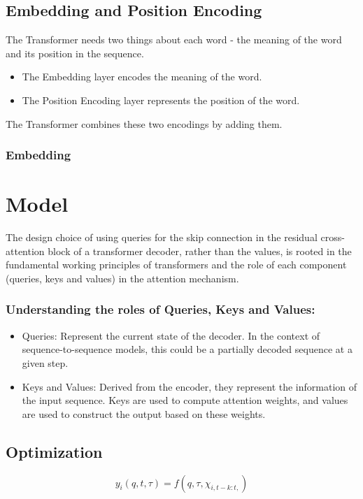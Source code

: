 \documentclass{article}
\begin{document}
\subsection{Embedding and Position Encoding}
The Transformer needs two things about each word - the meaning of the word and its position in the sequence.
\begin{itemize}
    \item The Embedding layer encodes the meaning of the word.
    \item The Position Encoding layer represents the position of the word.
\end{itemize}
The Transformer combines these two encodings by adding them.
\subsubsection{Embedding}

































\section{Model}
The design choice of using queries for the skip connection in the residual cross-attention block of a transformer decoder, rather than the values, is rooted in the fundamental working principles of transformers and the role of each component (queries, keys and values) in the attention mechanism.


\subsubsection{Understanding the roles of Queries, Keys and Values:}
\begin{itemize}
    \item Queries: Represent the current state of the decoder. In the context of sequence-to-sequence models, this could be a partially decoded sequence at a given step.
    \item Keys and Values: Derived from the encoder, they represent the information of the input sequence. Keys are used to compute attention weights, and values are used to construct the output based on these weights.
\end{itemize}
\subsection{Optimization}
\begin{equation}
    y_i(q,t,\tau) = f(q,\tau,\chi_{i,t-k:t,})
\end{equation}
\end{document}

